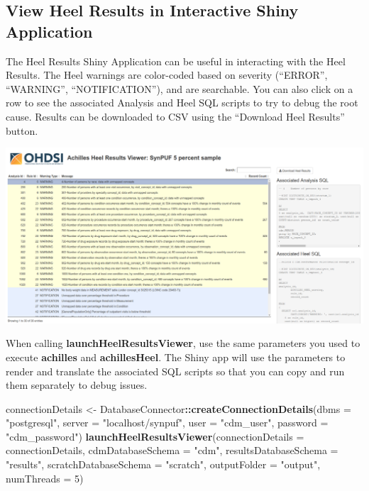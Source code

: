\documentclass[]{article}
\newenvironment{Shaded}{\begin{snugshade}}{\end{snugshade}}
\newcommand{\KeywordTok}[1]{\textcolor[rgb]{0.13,0.29,0.53}{\textbf{#1}}}
\newcommand{\DataTypeTok}[1]{\textcolor[rgb]{0.13,0.29,0.53}{#1}}
\newcommand{\DecValTok}[1]{\textcolor[rgb]{0.00,0.00,0.81}{#1}}
\newcommand{\StringTok}[1]{\textcolor[rgb]{0.31,0.60,0.02}{#1}}
\newcommand{\OperatorTok}[1]{\textcolor[rgb]{0.81,0.36,0.00}{\textbf{#1}}}
\newcommand{\NormalTok}[1]{#1}
\begin{document}
\subsection{View Heel Results in Interactive Shiny
Application}\label{view-heel-results-in-interactive-shiny-application}

The Heel Results Shiny Application can be useful in interacting with the
Heel Results. The Heel warnings are color-coded based on severity
(``ERROR'', ``WARNING'', ``NOTIFICATION''), and are searchable. You can
also click on a row to see the associated Analysis and Heel SQL scripts
to try to debug the root cause. Results can be downloaded to CSV using
the ``Download Heel Results'' button.

\includegraphics{../inst/doc/shinyHeel_screenshot.png}

When calling \textbf{launchHeelResultsViewer}, use the same parameters
you used to execute \textbf{achilles} and \textbf{achillesHeel}. The
Shiny app will use the parameters to render and translate the associated
SQL scripts so that you can copy and run them separately to debug
issues.

\begin{Shaded}
\begin{Highlighting}[]
\NormalTok{connectionDetails <-}\StringTok{ }\NormalTok{DatabaseConnector}\OperatorTok{::}\KeywordTok{createConnectionDetails}\NormalTok{(}\DataTypeTok{dbms =} \StringTok{"postgresql"}\NormalTok{, }
                                                                \DataTypeTok{server =} \StringTok{"localhost/synpuf"}\NormalTok{, }
                                                                \DataTypeTok{user =} \StringTok{"cdm_user"}\NormalTok{, }
                                                                \DataTypeTok{password =} \StringTok{"cdm_password"}\NormalTok{)}
\KeywordTok{launchHeelResultsViewer}\NormalTok{(}\DataTypeTok{connectionDetails =}\NormalTok{ connectionDetails, }
                        \DataTypeTok{cdmDatabaseSchema =} \StringTok{"cdm"}\NormalTok{, }
                        \DataTypeTok{resultsDatabaseSchema =} \StringTok{"results"}\NormalTok{, }
                        \DataTypeTok{scratchDatabaseSchema =} \StringTok{"scratch"}\NormalTok{,}
                        \DataTypeTok{outputFolder =} \StringTok{"output"}\NormalTok{, }
                        \DataTypeTok{numThreads =} \DecValTok{5}\NormalTok{)}
\end{Highlighting}
\end{Shaded}
\end{document}
